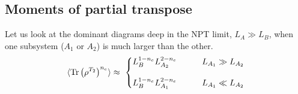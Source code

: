 \documentclass[aps,pra,groupedaddress,onecolumn,notitlepage,superscriptaddress,10pt]{revtex4-1}
\newcommand{\Tr}{\text{Tr}}
\begin{document}
\subsection{Moments of partial transpose}


Let us look at the dominant diagrams deep in the NPT limit, $L_A\gg L_B$, when one subsystem ($A_1$ or $A_2$) is much larger than the other. 
\begin{align}
    \braket{\Tr \left(\rho^{T_2}\right)^{n_e} } \approx \ 
    \left\{
    \begin{matrix}
    L_{B}^{1-n_e} L_{A_2}^{2-n_e} & \qquad  L_{A_1} \gg L_{A_2}
    \\
    \\
    L_{B}^{1-n_e} L_{A_1}^{2-n_e} & \qquad  L_{A_1} \ll L_{A_2}
    \end{matrix}
    \right.
\end{align}
\end{document}
